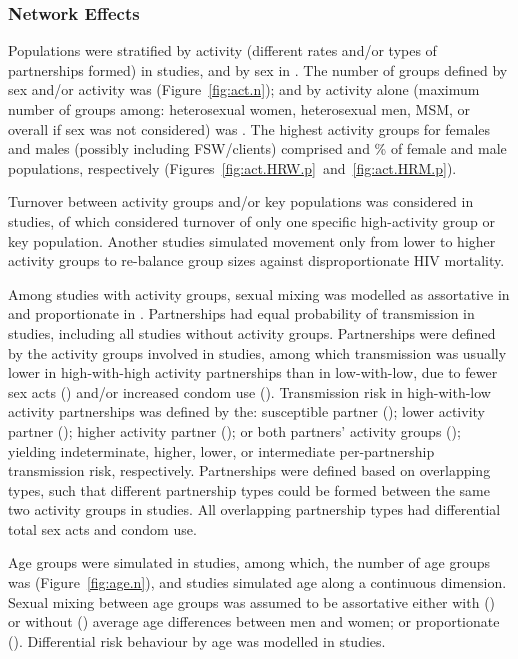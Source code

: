 \subsubsection{Network Effects}
\label{sss:res:network}
Populations were stratified by activity (different rates and/or types of partnerships formed)
in  studies, and by sex in .
The number of groups defined by sex and/or activity was   (Figure~\ref{fig:act.n});
and by activity alone (maximum number of groups among:
heterosexual women, heterosexual men, MSM, or overall if sex was not considered) was .
The highest activity groups for females and males (possibly including FSW/clients) comprised
 and \% of female and male populations, respectively
(Figures~\ref{fig:act.HRW.p}~and~\ref{fig:act.HRM.p}).
\par
Turnover between activity groups and/or key populations
was considered in  studies,
of which  considered turnover of only
one specific high-activity group or key population.
Another  studies simulated
movement only from lower to higher activity groups
to re-balance group sizes against disproportionate HIV mortality.
\par
Among  studies with activity groups, sexual mixing was modelled as
assortative in  and proportionate in .
Partnerships had equal probability of transmission in  studies,
including all studies without activity groups.
Partnerships were defined by the activity groups involved in  studies,
among which transmission was usually
lower in high-with-high activity partnerships than in low-with-low, due to
fewer sex acts () and/or increased condom use ().
Transmission risk in high-with-low activity partnerships was defined by the:
susceptible partner ();
lower activity partner ();
higher activity partner (); or
both partners' activity groups ();
yielding indeterminate, higher, lower, or intermediate
per-partnership transmission risk, respectively.
Partnerships were defined based on overlapping types, such that
different partnership types could be formed between the same two activity groups in  studies.
All overlapping partnership types had differential total sex acts and condom use.
\par
Age groups were simulated in  studies, among which,
the number of age groups was  (Figure~\ref{fig:age.n}),
and  studies simulated age along a continuous dimension.
Sexual mixing between age groups was assumed to be assortative
either with () or without ()
average age differences between men and women;
or proportionate ().
Differential risk behaviour by age was modelled in  studies.
